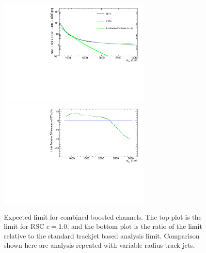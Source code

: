 \begin{figure}[htbp!]
\begin{center}
\includegraphics[width=0.68\textwidth,angle=-90]{figures/boosted/AppendixOptimization/CompareLimits_HH_BoostedNewRun2-vr_c10.pdf}\\
\includegraphics[width=0.68\textwidth,angle=-90]{figures/boosted/AppendixOptimization/CompareLimits_HH_BoostedNewRun2-vr_c10_ratio.pdf}
  \caption{Expected limit for combined boosted channels. The top plot is the limit for RSC $c=1.0$, and the bottom plot is the ratio of the limit relative to the standard trackjet based analysis limit. Comparison shown here are analysis repeated with variable radius track jets.}
  \label{fig:app-optimization-vr}
\end{center}
\end{figure}

\clearpage
